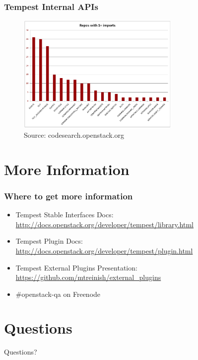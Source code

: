 \documentclass[aspectratio=169,11pt,hyperref={colorlinks=true}]{beamer}
\begin{document}
\begin{frame}
    \frametitle{Tempest Internal APIs}
    \begin{figure}[p]
    	\centering
    	\includegraphics[width=0.7\textwidth]{tempest-imports.png}
    	\caption{Source: codesearch.openstack.org}
    \end{figure}
\end{frame}

\section{More Information}
\begin{frame}
\frametitle{Where to get more information}
    \begin{itemize}
        \item Tempest Stable Interfaces Docs: \href{http://docs.openstack.org/developer/tempest/library.html}{http://docs.openstack.org/developer/tempest/library.html}
        \item Tempest Plugin Docs: \href{http://docs.openstack.org/developer/tempest/plugin.html}{http://docs.openstack.org/developer/tempest/plugin.html}
        \item Tempest External Plugins Presentation: \href{https://github.com/mtreinish/external_plugins}{https://github.com/mtreinish/external\_plugins}
        \item \#openstack-qa on Freenode
    \end{itemize}
\end{frame}

\section{Questions}
\begin{frame}[c]
    \begin{center}
        \Huge Questions?
    \end{center}
\end{frame}

\end{document}

